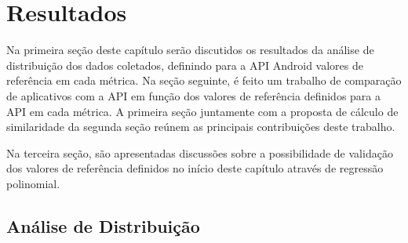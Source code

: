 \chapter{Resultados}
\label{cap:resultados}

Na primeira seção deste capítulo serão discutidos os resultados da análise de distribuição dos dados coletados, definindo para a API Android valores de referência em cada métrica. Na seção seguinte, é feito um trabalho de comparação de aplicativos com a API em função dos valores de referência definidos para a API em cada métrica. A primeira seção juntamente com a proposta de cálculo de similaridade da segunda seção reúnem as principais contribuições deste trabalho.

Na terceira seção, são apresentadas discussões sobre a possibilidade de validação dos valores de referência definidos no início deste capítulo através de regressão polinomial.

\section{Análise de Distribuição}

